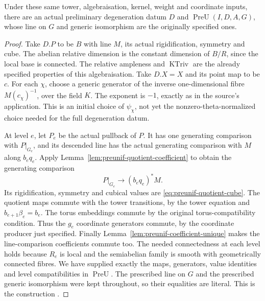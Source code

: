\begin{srproposition}
\label{prop:preunif-assembly}
Under these same tower, algebraisation, kernel, weight and
coordinate inputs, there are an actual preliminary degeneration
datum \(D\) and \(\operatorname{PreU}(I,D,A,G)\), whose line on
\(G\) and generic isomorphism are the originally specified ones.
\end{srproposition}
\begin{proof}
Take \(D.P\) to be \(B\) with line \(M\), its actual
rigidification, symmetry and cube.  The abelian relative dimension
is the constant dimension of \(B/R\), since the local base is
connected.  The relative ampleness and \(\operatorname{KTriv}\)
are the already specified properties of this algebraisation.
Take \(D.X=X\) and its point map to be \(c\).
For each \(\chi\), choose a generic generator of the inverse
one-dimensional fibre \(M(c_\chi)^{-1}\), over the field \(K\).
The exponent is \(-1\), exactly as in the source's
 application.
This is an initial choice of \(\psi_\chi\), not yet the
nonzero-theta-normalized choice needed for the full degeneration
datum.

At level \(e\), let \(P_e\) be the actual pullback of \(P\).
It has one generating comparison with \(P|_{G_e}\), and its
descended line has the actual generating comparison with
\(M\) along \(b_eq_e\).
Apply Lemma~\ref{lem:preunif-quotient-coefficient} to obtain the
generating comparison
\[
                   P|_{G_e}\longrightarrow (b_eq_e)^*M.
\]
Its rigidification, symmetry and cubical values are
\eqref{eq:preunif-quotient-cube}.
The quotient maps commute with the tower transitions, by the
tower equation and \(b_{e+1}\beta_e=b_e\).
The torus embeddings commute by the original torus-compatibility
condition.  Thus the \(g_e\) coordinate generators commute, by
the coordinate producer just specified.
Finally Lemma~\ref{lem:preunif-coefficient-unique} makes the
line-comparison coefficients commute too.
The needed connectedness at each level holds because \(R_e\)
is local and the semiabelian family is smooth with geometrically
connected fibres.  We have supplied exactly the maps, generators,
value identities and level compatibilities in
\(\operatorname{PreU}\).
The prescribed line on \(G\) and the prescribed generic
isomorphism were kept throughout, so their equalities are
literal.  This is the construction .
\end{proof}

